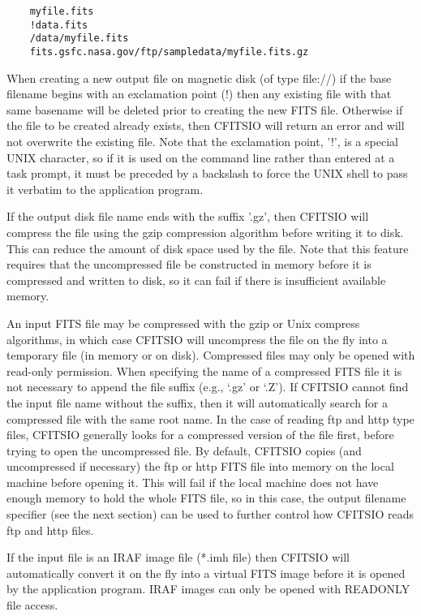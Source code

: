 \documentclass[11pt]{book}
\begin{document}
\begin{verbatim}
    myfile.fits
    !data.fits
    /data/myfile.fits
    fits.gsfc.nasa.gov/ftp/sampledata/myfile.fits.gz
\end{verbatim}

When creating a new output file on magnetic disk (of type file://) if
the base filename begins with an exclamation point (!) then any
existing file with that same basename will be deleted prior to creating
the new FITS file.  Otherwise if the file to be created already exists,
then CFITSIO will return an error and will not overwrite the existing
file.  Note  that the exclamation point,  '!', is a special UNIX character,
so if it is used  on the command line rather than entered at a task
prompt, it must be  preceded by a backslash to force the UNIX
shell to pass it verbatim to the application program.

If the output disk file name ends with the suffix '.gz', then CFITSIO
will compress the file using the gzip compression algorithm before
writing it to disk.  This can reduce the amount of disk space used by
the file.  Note that this feature requires that the uncompressed file
be constructed in memory before it is compressed and written to disk,
so it can fail if there is insufficient available memory.

An input FITS file may be compressed with the gzip or Unix compress
algorithms, in which case CFITSIO will uncompress the file on the fly
into a temporary file (in memory or on disk).  Compressed files may
only be opened with read-only permission.  When specifying the name of
a compressed FITS file it is not necessary to append the file suffix
(e.g., `.gz' or `.Z').  If CFITSIO cannot find the input file name
without the suffix, then it will automatically search for a compressed
file with the same root name.  In the case of reading ftp and http type
files, CFITSIO generally looks for a compressed version of the file
first, before trying to open the uncompressed file.  By default,
CFITSIO copies (and uncompressed if necessary) the ftp or http FITS
file into memory on the local machine before opening it.  This will
fail if the local machine does not have enough memory to hold the whole
FITS file, so in this case, the output filename specifier (see the next
section) can be used to further control how CFITSIO reads ftp and http
files.

If the input file is an IRAF image file (*.imh file) then CFITSIO will
automatically convert it on the fly into a virtual FITS image before it
is opened by the application program.  IRAF images can only be opened
with READONLY file access.
\end{document}
